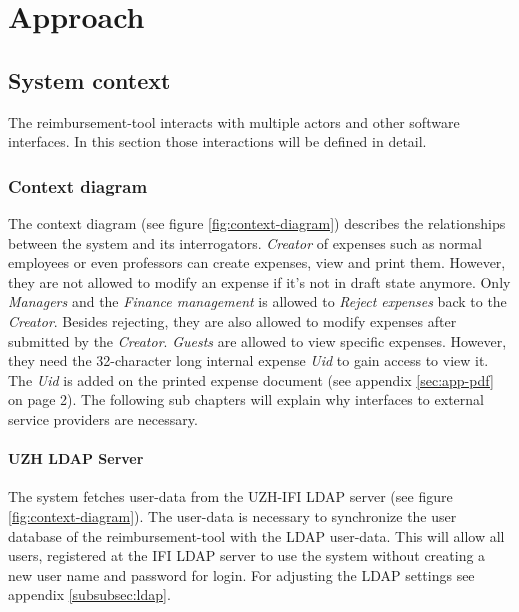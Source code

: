 \chapter{Approach}

\section{System context}

The reimbursement-tool interacts with multiple actors and other software interfaces. In this section those interactions will be defined in detail.

\subsection{Context diagram}

The context diagram (see figure \ref{fig:context-diagram}) describes the relationships between the system and its interrogators. \textit{Creator} of expenses such as normal employees or even professors can create expenses, view and print them. However, they are not allowed to modify an expense if it's not in draft state anymore. Only \textit{Managers} and the \textit{Finance management} is allowed to \textit{Reject expenses} back to the \textit{Creator}. Besides rejecting, they are also allowed to modify expenses after submitted by the \textit{Creator}.\newline
\textit{Guests} are allowed to view specific expenses. However, they need the 32-character long internal expense \textit{Uid} to gain access to view it. The \textit{Uid} is added on the printed expense document (see appendix \ref{sec:app-pdf} on page 2).\newline
The following sub chapters will explain why interfaces to external service providers are necessary.

\subsubsection{UZH LDAP Server}

The system fetches user-data from the UZH-IFI LDAP server (see figure \ref{fig:context-diagram}). The user-data is necessary to synchronize the user database of the reimbursement-tool with the LDAP user-data. This will allow all users, registered at the IFI LDAP server to use the system without creating a new user name and password for login. For adjusting the LDAP settings see appendix \ref{subsubsec:ldap}.


